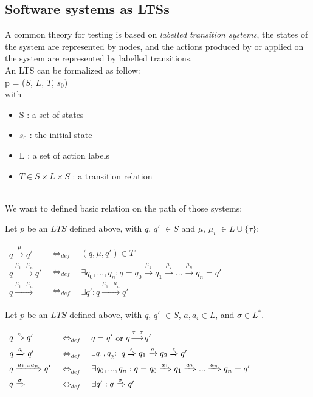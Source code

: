 \documentclass[a4paper]{report}
\begin{document}
\subsection*{Software systems as LTSs}
A common theory for testing is based on \textit{labelled transition systems}, the states of the system are represented by nodes, and the actions produced by or applied on the system are represented by labelled transitions.\\ An LTS can be formalized as follow:\\
p = ($S$, $L$, $T$, $s_0$)\\
with 
\begin{itemize}
\item S : a set of states
\item $s_0$ : the initial state
\item L : a set of action labels
\item $T \in S \times L \times S$ : a transition relation
\end{itemize}
$ $\\
\newline
We want to defined basic relation on the path of those systems:\\
\begin{definition}
Let $p$ be an $LTS$ defined above, with $q$, $q'$ $\in S$ and $\mu$, $\mu_i$ $\in L \cup \{\tau \}$:\\
\begin{tabular}{lll}
   $q \xrightarrow{\mu} q'$ & $\Leftrightarrow_{def}$ & $(q, \mu , q') \in T$ \\
   $q \xrightarrow{\mu_1 ... \mu_n} q'$ & $\Leftrightarrow_{def}$ & $\exists q_0, ..., q_n : q=q_0 \xrightarrow{\mu_1} q_1 \xrightarrow{\mu_2} ... \xrightarrow{\mu_n} q_n = q'$ \\
   $q \xrightarrow{\mu_1 ... \mu_n}$ & $\Leftrightarrow_{def}$ & $\exists q' : q \xrightarrow{\mu_1 ... \mu_n} q'$ \\
\end{tabular}
\end{definition}

\begin{definition}
Let $p$ be an $LTS$ defined above, with $q$, $q'$ $\in S$, $a, a_i \in L$, and $\sigma \in L^*$.\\
\begin{tabular}{lll}
   $q \xRightarrow{\epsilon} q'$ & $\Leftrightarrow_{def}$ & $q = q'$ or $ q \xrightarrow{\tau ... \tau} q'$ \\
   $q \xRightarrow{a} q'$ & $\Leftrightarrow_{def}$ & $\exists q_1, q_2 :$ $q \xRightarrow{\epsilon} q_1 \xrightarrow{a} q_2 \xRightarrow{\epsilon} q'$ \\
   $q \xRightarrow{a_1 ... a_n} q'$ & $\Leftrightarrow_{def}$ & $\exists q_0, ..., q_n : q=q_0 \xRightarrow{a_1} q_1 \xRightarrow{a_2} ... \xRightarrow{a_n} q_n = q'$ \\
   $q \xRightarrow{\sigma}$ & $\Leftrightarrow_{def}$ & $\exists q' : q \xRightarrow{\sigma} q'$ \\
\end{tabular}
\end{definition}
\end{document}
